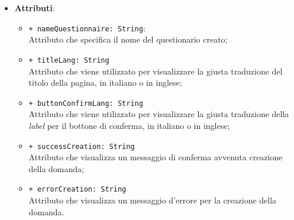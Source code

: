 \begin{itemize}
\begin{itemize}
	\end{itemize}
		\item \textbf{Attributi}:
		\begin{itemize}
			\item \texttt{+ nameQuestionnaire: String}: \\ Attributo che specifica il nome del questionario creato;
			\item \texttt{+ titleLang: String} \\ Attributo che viene utilizzato per visualizzare la giusta traduzione del titolo della pagina, in italiano o in inglese;
			\item \texttt{+ buttonConfirmLang: String} \\ Attributo che viene utilizzato per visualizzare la giusta traduzione della \textit{label} per il bottone di conferma, in italiano o in inglese;
			\item \texttt{+ successCreation: String} \\ Attributo che visualizza un messaggio di conferma avvenuta creazione della domanda;
			\item \texttt{+ errorCreation: String} \\ Attributo che visualizza un messaggio d'errore per la creazione della domanda.
		\end{itemize}
\end{itemize}


